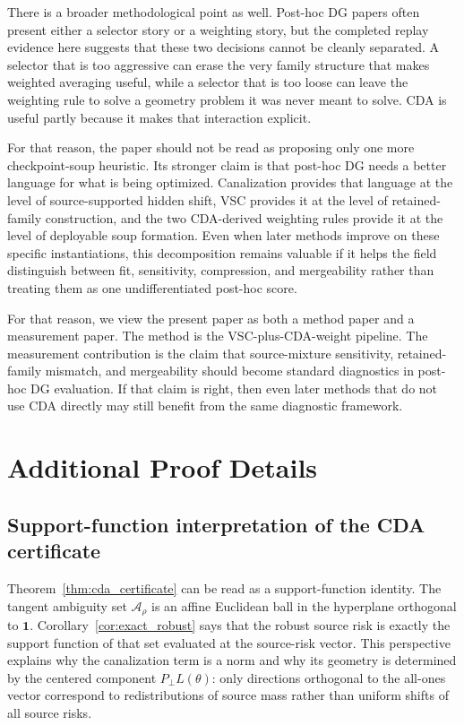 \documentclass{article}
\theoremstyle{definition}
\newcommand{\cA}{\mathcal{A}}
\newcommand{\one}{\mathbf{1}}
\begin{document}
There is a broader methodological point as well. Post-hoc DG papers often present either a selector story or a weighting story, but the completed replay evidence here suggests that these two decisions cannot be cleanly separated. A selector that is too aggressive can erase the very family structure that makes weighted averaging useful, while a selector that is too loose can leave the weighting rule to solve a geometry problem it was never meant to solve. CDA is useful partly because it makes that interaction explicit.

For that reason, the paper should not be read as proposing only one more checkpoint-soup heuristic. Its stronger claim is that post-hoc DG needs a better language for what is being optimized. Canalization provides that language at the level of source-supported hidden shift, VSC provides it at the level of retained-family construction, and the two CDA-derived weighting rules provide it at the level of deployable soup formation. Even when later methods improve on these specific instantiations, this decomposition remains valuable if it helps the field distinguish between fit, sensitivity, compression, and mergeability rather than treating them as one undifferentiated post-hoc score.

For that reason, we view the present paper as both a method paper and a measurement paper. The method is the VSC-plus-CDA-weight pipeline. The measurement contribution is the claim that source-mixture sensitivity, retained-family mismatch, and mergeability should become standard diagnostics in post-hoc DG evaluation. If that claim is right, then even later methods that do not use CDA directly may still benefit from the same diagnostic framework.

\appendix

\section{Additional Proof Details}

\subsection{Support-function interpretation of the CDA certificate}

Theorem~\ref{thm:cda_certificate} can be read as a support-function identity. The tangent ambiguity set \(\cA_\rho\) is an affine Euclidean ball in the hyperplane orthogonal to \(\one\). Corollary~\ref{cor:exact_robust} says that the robust source risk is exactly the support function of that set evaluated at the source-risk vector. This perspective explains why the canalization term is a norm and why its geometry is determined by the centered component \(P_\perp L(\theta)\): only directions orthogonal to the all-ones vector correspond to redistributions of source mass rather than uniform shifts of all source risks.
\end{document}
